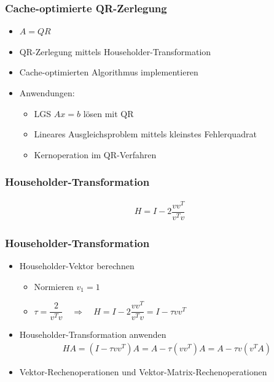 \begin{frame}
\frametitle{Cache-optimierte QR-Zerlegung}
\vspace{-.6cm}
\begin{itemize}
	\item $ A = QR $
	
	\item QR-Zerlegung mittels Householder-Transformation
	\item Cache-optimierten Algorithmus implementieren
	\item Anwendungen:
	\begin{itemize}
		\item LGS $ Ax = b $ lösen mit QR
		\item Lineares Ausgleichsproblem mittels kleinstes Fehlerquadrat
		\item Kernoperation im QR-Verfahren
	\end{itemize}
\end{itemize}

\end{frame}

\begin{frame}
	\frametitle{Householder-Transformation}
	\vspace{-1cm}
	\begin{align*}
		H = I - 2 \dfrac{vv^T}{v^Tv}
	\end{align*}
	\centering
	\scalebox{.8}{}

\end{frame}

\begin{frame}
	\frametitle{Householder-Transformation}
	\vspace{-1cm}
	\begin{itemize}
	\item Householder-Vektor berechnen\\
		\begin{itemize}
			\item Normieren $ v_1 = 1 $
			\item $ \tau = \dfrac{2}{v^Tv} \quad \Longrightarrow \quad H = I - 2 \dfrac{vv^T}{v^Tv} = I - \tau vv^T$
		\end{itemize}
		

	\item  Householder-Transformation anwenden
		\begin{align*} 
		H A =(I - \tau vv^T) A= A - \tau (vv^T )A = A - \tau v(v^TA)
		\end{align*}
	\item  Vektor-Rechenoperationen und Vektor-Matrix-Rechenoperationen
	\end{itemize}
\end{frame}

